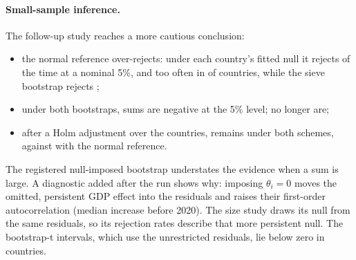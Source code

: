 \paragraph{Small-sample inference.} The follow-up study reaches a more cautious
conclusion:
\begin{itemize}
  \item the normal reference over-rejects: under each country's fitted null it rejects
     of the time at a nominal 5\%, and too often in
     of  countries, while the sieve bootstrap
    rejects ;
  \item under both bootstraps,  sums are negative at the 5\% level;
     no longer are;
  \item after a Holm adjustment over the countries,  remains under
    both schemes, against  with the normal reference.
\end{itemize}
The registered null-imposed bootstrap understates the evidence when a sum is large. A
diagnostic added after the run shows why: imposing $\theta_i=0$ moves the omitted,
persistent GDP effect into the residuals and raises their first-order autocorrelation
(median increase  before 2020). The size study draws its null from the
same residuals, so its rejection rates describe that more persistent null. The
bootstrap-t intervals, which use the unrestricted residuals, lie below zero in
 countries.

